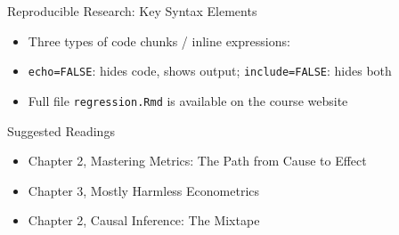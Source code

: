 \documentclass[dvipsnames,hyperref={pdfpagelabels=false}]{beamer}
\begin{document}
\begin{frame}[fragile]{Reproducible Research: Key Syntax Elements}

	\begin{itemize}
		\item Three types of code chunks / inline expressions:
	\end{itemize}

	\vspace{0.2cm}


	\vspace{0.3cm}

	\begin{itemize}
		\item \texttt{echo=FALSE}: hides code, shows output; \texttt{include=FALSE}: hides both
		\vspace{0.2cm}
		\item Full file \texttt{regression.Rmd} is available on the course website
	\end{itemize}

\end{frame}


\begin{frame}{Suggested Readings}
	\begin{itemize} 
		\item Chapter 2, Mastering Metrics: The Path from Cause to Effect
		\vspace{0.2cm}
		\item Chapter 3, Mostly Harmless Econometrics
		\vspace{0.2cm}
		\item Chapter 2, Causal Inference: The Mixtape
	\end{itemize}
\end{frame}
\end{document}
